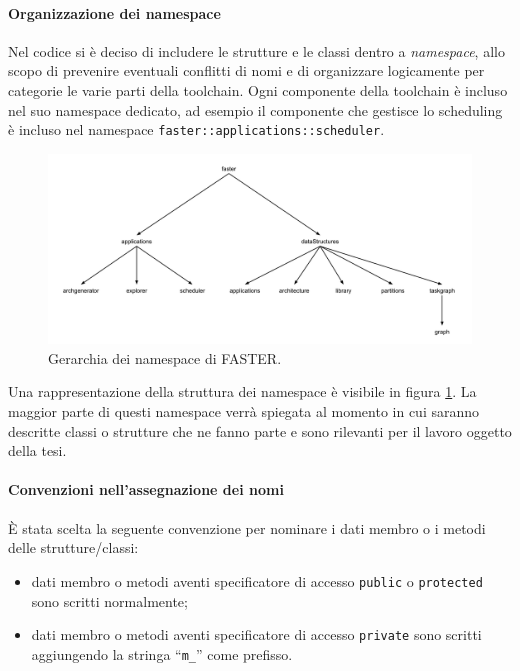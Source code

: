 \paragraph{Organizzazione dei namespace}
Nel codice si è deciso di includere le strutture e le classi dentro a 
\emph{namespace}, allo scopo di prevenire eventuali conflitti di nomi e di 
organizzare logicamente per categorie le varie parti della toolchain. Ogni componente
della toolchain è incluso nel suo namespace dedicato, ad esempio il componente che
gestisce lo scheduling è incluso nel namespace \verb+faster::applications::scheduler+.

\begin{figure}
 \begin{center}
\includegraphics[width=\textwidth]{capitoli/figure/cap5/FASTERNamespaces.pdf}
\caption{Gerarchia dei namespace di \acs{FASTER}.}
\label{fig:gerarchiaNamespace}
 \end{center}
\end{figure}

Una rappresentazione della struttura dei namespace è visibile in figura 
\ref{fig:gerarchiaNamespace}. La maggior parte di questi namespace verrà 
spiegata al momento in cui saranno descritte classi o strutture che ne fanno parte 
e sono rilevanti per il lavoro oggetto della tesi.

\paragraph{Convenzioni nell'assegnazione dei nomi}
È stata scelta la seguente convenzione per nominare i dati membro o i metodi 
delle strutture/classi:
\begin{itemize}
 \item dati membro o metodi aventi specificatore di accesso 
\verb+public+ o \verb+protected+ sono scritti normalmente;
 \item dati membro o metodi aventi specificatore di accesso 
\verb+private+ sono scritti aggiungendo la stringa ``\verb+m_+'' come prefisso.
\end{itemize}

